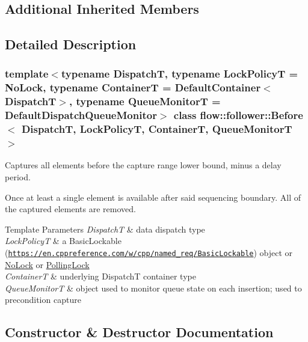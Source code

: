 \subsection*{Additional Inherited Members}


\subsection{Detailed Description}
\subsubsection*{template$<$typename DispatchT, typename Lock\+PolicyT = No\+Lock, typename ContainerT = Default\+Container$<$\+Dispatch\+T$>$, typename Queue\+MonitorT = Default\+Dispatch\+Queue\+Monitor$>$\newline
class flow\+::follower\+::\+Before$<$ Dispatch\+T, Lock\+Policy\+T, Container\+T, Queue\+Monitor\+T $>$}

Captures all elements before the capture range lower bound, minus a delay period. 

Once at least a single element is available after said sequencing boundary. All of the captured elements are removed.


\begin{DoxyTemplParams}{Template Parameters}
{\em DispatchT} & data dispatch type \\
\hline
{\em Lock\+PolicyT} & a Basic\+Lockable (\href{https://en.cppreference.com/w/cpp/named_req/BasicLockable}{\tt https\+://en.\+cppreference.\+com/w/cpp/named\+\_\+req/\+Basic\+Lockable}) object or \hyperlink{structflow_1_1_no_lock}{No\+Lock} or \hyperlink{structflow_1_1_polling_lock}{Polling\+Lock} \\
\hline
{\em ContainerT} & underlying {\ttfamily DispatchT} container type \\
\hline
{\em Queue\+MonitorT} & object used to monitor queue state on each insertion; used to precondition capture \\
\hline
\end{DoxyTemplParams}


\subsection{Constructor \& Destructor Documentation}
\mbox{\label{classflow_1_1follower_1_1_before_a8245d0990db036bd525f3534ef7876bb}} 
